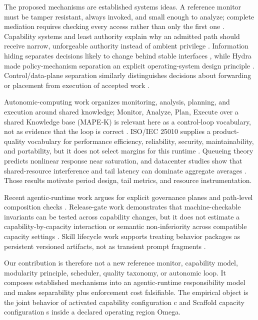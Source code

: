 The proposed mechanisms are established systems ideas. A reference monitor must be tamper resistant, always invoked, and small enough to analyze; complete mediation requires checking every access rather than only the first one \cite{anderson1972reference,saltzer1975protection}. Capability systems and least authority explain why an admitted path should receive narrow, unforgeable authority instead of ambient privilege \cite{miller2003capability,saltzer1975protection}. Information hiding separates decisions likely to change behind stable interfaces \cite{parnas1972criteria}, while Hydra made policy-mechanism separation an explicit operating-system design principle \cite{levin1975hydra}. Control/data-plane separation similarly distinguishes decisions about forwarding or placement from execution of accepted work \cite{kreutz2015sdn}.

Autonomic-computing work organizes monitoring, analysis, planning, and execution around shared knowledge; Monitor, Analyze, Plan, Execute over a shared Knowledge base (MAPE-K) is relevant here as a control-loop vocabulary, not as evidence that the loop is correct \cite{kephart2003autonomic,ibm2006autonomic}. ISO/IEC 25010 supplies a product-quality vocabulary for performance efficiency, reliability, security, maintainability, and portability, but it does not select margins for this runtime \cite{iso25010}. Queueing theory predicts nonlinear response near saturation, and datacenter studies show that shared-resource interference and tail latency can dominate aggregate averages \cite{kleinrock1975queueing,mars2011bubbleup,dean2013tail}. Those results motivate period design, tail metrics, and resource instrumentation.

Recent agentic-runtime work argues for explicit governance planes and path-level composition checks \cite{tallam2026fiveplane,xie2026composition}. Release-gate work demonstrates that machine-checkable invariants can be tested across capability changes, but it does not estimate a capability-by-capacity interaction or semantic non-inferiority across compatible capacity settings \cite{soni2026gates}. Skill lifecycle work supports treating behavior packages as persistent versioned artifacts, not as transient prompt fragments \cite{fan2026skillware}.

Our contribution is therefore not a new reference monitor, capability model, modularity principle, scheduler, quality taxonomy, or autonomic loop. It composes established mechanisms into an agentic-runtime responsibility model and makes separability plus enforcement cost falsifiable. The empirical object is the joint behavior of activated capability configuration c and Scaffold capacity configuration s inside a declared operating region Omega.

